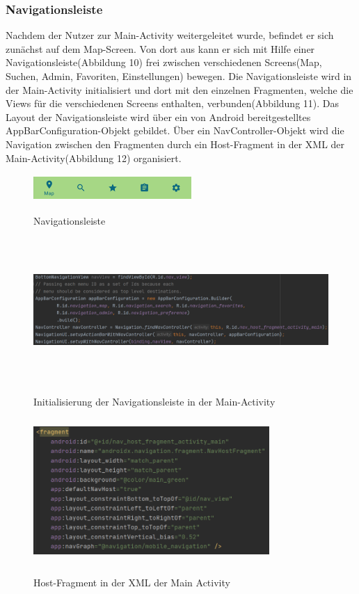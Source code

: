 \documentclass[12pt, a4paper, oneside]{article}
\begin{document}
\subsubsection{Navigationsleiste}
Nachdem der Nutzer zur Main-Activity weitergeleitet wurde, befindet er sich zunächst auf dem Map-Screen. Von dort aus kann er sich mit Hilfe einer Navigationsleiste(Abbildung 10) frei zwischen verschiedenen Screens(Map, Suchen, Admin, Favoriten, Einstellungen) bewegen. Die Navigationsleiste wird in der Main-Activity initialisiert und dort mit den einzelnen Fragmenten, welche die Views für die verschiedenen Screens enthalten, verbunden(Abbildung 11). Das Layout der Navigationsleiste wird über ein von Android bereitgestelltes AppBarConfiguration-Objekt gebildet. Über ein NavController-Objekt wird die Navigation zwischen den Fragmenten durch ein Host-Fragment in der XML der Main-Activity(Abbildung 12) organisiert.
\begin{figure}
\includegraphics[width=6cm, height=1cm]{Navigationsleiste.png}
\centering
\label{navbar}
\caption{Navigationsleiste}
\end{figure}
\begin{figure}
\includegraphics[width=1\textwidth, height=5.5cm]{navbar_setup.png}
\centering
\label{nav_setup}
\caption{Initialisierung der Navigationsleiste in der Main-Activity}
\end{figure}
\begin{figure}
\includegraphics[width=0.8\textwidth, height=5.5cm]{Host-Fragment.png}
\centering
\label{host_fragment}
\caption{Host-Fragment in der XML der Main Activity}
\end{figure}
\end{document}
